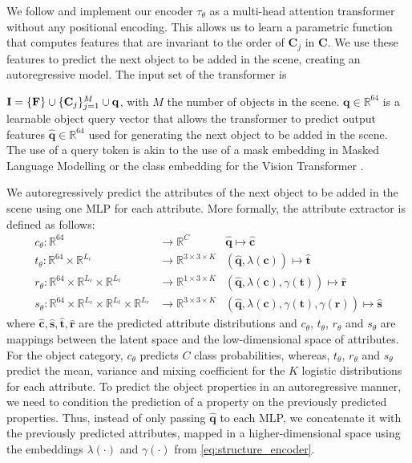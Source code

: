 \documentclass{article}
\newcommand{\bc}{\mathbf{c}}\newcommand{\bC}{\mathbf{C}}
\newcommand{\bq}{\mathbf{q}}\newcommand{\bQ}{\mathbf{Q}}
\newcommand{\br}{\mathbf{r}}\newcommand{\bR}{\mathbf{R}}
\newcommand{\bs}{\mathbf{s}}\newcommand{\bS}{\mathbf{S}}
\newcommand{\bt}{\mathbf{t}}\newcommand{\bT}{\mathbf{T}}
\newcommand{\boldparagraph}[1]{\vspace{0.2cm}\noindent{\bf #1:} }
\begin{document}
\vspace{-2mm}
\boldparagraph{Transformer Encoder}We follow \cite{Vaswani2017NIPS, Devlin2019NAACL} and implement our encoder
$\tau_{\theta}$ as a multi-head attention transformer without any positional
encoding. This allows us to learn a parametric function that computes features
that are invariant to the order of $\bC_j$ in $\bC$. We use these features to
predict the next object to be added in the scene, creating an
autoregressive model. The input set of the transformer is

$\bI=\{\bF\}\cup\{\bC_j\}_{j=1}^M \cup{\bq}$, with $M$ the number of
objects in the scene. $\bq \in \mathbb{R}^{64}$ is a learnable object
query vector that allows the transformer to predict output features
$\hat{\bq} \in \mathbb{R}^{64}$ used for generating the next
object to be added in the scene.  The use of a query token is akin to the use of a mask
embedding in Masked Language Modelling \cite{Devlin2019NAACL} or the class
embedding for the Vision Transformer \cite{Sharir2021ICLR}.

\vspace{-2mm}
\boldparagraph{Attribute Extractor}We autoregressively predict the attributes
of the next object to be added in the scene using one MLP for each attribute.
More formally, the attribute extractor is defined as follows:
\begin{align}
    c_{\theta}: \mathbb{R}^{64} &\rightarrow \mathbb{R}^C &\hat{\bq} \mapsto \hat{\bc} \label{eq:att_ectractor_1} \\
    t_{\theta}: \mathbb{R}^{64}\times \mathbb{R}^{L_c} &\rightarrow \mathbb{R}^{3\times 3\times K}
        & (\hat{\bq}, \lambda(\bc)) \mapsto \hat{\bt} \\
    r_{\theta}: \mathbb{R}^{64}\times \mathbb{R}^{L_c} \times\mathbb{R}^{L_t} &\rightarrow \mathbb{R}^{1\times 3\times K}
    & (\hat{\bq}, \lambda(\bc), \gamma(\bt)) \mapsto \hat{\br} \\
    s_{\theta}: \mathbb{R}^{64}\times \mathbb{R}^{L_c} \times\mathbb{R}^{L_t} \times \mathbb{R}^{L_r} &\rightarrow \mathbb{R}^{3\times 3\times K}
    & (\hat{\bq}, \lambda(\bc), \gamma(\bt), \gamma(\br)) \mapsto \hat{\bs} \label{eq:att_ectractor_2}
\end{align}
where $\hat{\bc}, \hat{\bs}, \hat{\bt}, \hat{\br}$ are the predicted
attribute distributions and $c_\theta$, $t_\theta$, $r_\theta$ and $s_\theta$ are mappings between the latent space and the low-dimensional space of attributes.
For the object category, $c_\theta$ predicts $C$ class probabilities, whereas,
$t_\theta$, $r_\theta$ and $s_\theta$ predict the mean, variance and
mixing coefficient for the $K$ logistic distributions for each attribute.
To predict the object properties in an autoregressive manner, we need to
condition the prediction of a property on the previously predicted properties.
Thus, instead of only passing $\hat{\bq}$ to each MLP, we concatenate it with
the previously predicted attributes, mapped in a
higher-dimensional space using the embeddings
$\lambda(\cdot)$ and $\gamma(\cdot)$ from \eqref{eq:structure_encoder}.
\end{document}
